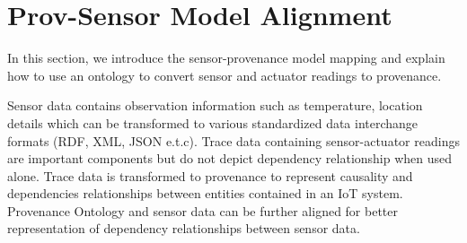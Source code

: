 \documentclass[conference]{IEEEtran}
\begin{document}
%





%



\section {Prov-Sensor Model Alignment}
In this section, we introduce the sensor-provenance model mapping and explain how to use an ontology to convert sensor and actuator readings to provenance.

\par Sensor data contains observation information such as temperature, location details which can be transformed to various standardized data interchange formats (RDF, XML, JSON e.t.c). Trace data containing sensor-actuator readings are important components but do not depict dependency relationship when used alone. Trace data is transformed to provenance to represent causality and dependencies relationships between entities contained in an IoT system. Provenance Ontology and sensor data can be further aligned for better representation of dependency relationships between sensor data.
\end{document}
